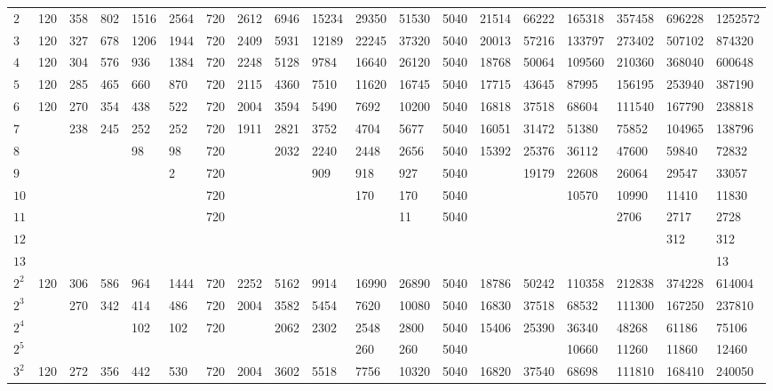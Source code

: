 \documentclass{amsart}
\numberwithin{equation}{section}
\begin{document}
\begin{table}
\begin{tabular}{@{}l GWGWGWGWGWGWGWGWGW@{}}
		$2$ & 120 & 358 & 802 & 1516 & 2564 & 720 & 2612 & 6946 & 15234 & 29350 & 51530 & 5040 & 21514 & 66222 & 165318 & 357458 & 696228 & 1252572 \\
		$3$ & 120 & 327 & 678 & 1206 & 1944 & 720 & 2409 & 5931 & 12189 & 22245 & 37320 & 5040 & 20013 & 57216 & 133797 & 273402 & 507102 & 874320 \\
		$4$ & 120 & 304 & 576 & 936 & 1384 & 720 & 2248 & 5128 & 9784 & 16640 & 26120 & 5040 & 18768 & 50064 & 109560 & 210360 & 368040 & 600648 \\
		$5$ & 120 & 285 & 465 & 660 & 870 & 720 & 2115 & 4360 & 7510 & 11620 & 16745 & 5040 & 17715 & 43645 & 87995 & 156195 & 253940 & 387190 \\
		$6$ & 120 & 270 & 354 & 438 & 522 & 720 & 2004 & 3594 & 5490 & 7692 & 10200 & 5040 & 16818 & 37518 & 68604 & 111540 & 167790 & 238818 \\
		$7$ &  & 238 & 245 & 252 & 252 & 720 & 1911 & 2821 & 3752 & 4704 & 5677 & 5040 & 16051 & 31472 & 51380 & 75852 & 104965 & 138796 \\
		$8$ &  &  &  & 98 & 98 & 720 &  & 2032 & 2240 & 2448 & 2656 & 5040 & 15392 & 25376 & 36112 & 47600 & 59840 & 72832 \\
		$9$ &  &  &  &  & 2 & 720 &  &  & 909 & 918 & 927 & 5040 &  & 19179 & 22608 & 26064 & 29547 & 33057 \\
		$10$ &  &  &  &  &  & 720 &  &  &  & 170 & 170 & 5040 &  &  & 10570 & 10990 & 11410 & 11830 \\
		$11$ &  &  &  &  &  & 720 &  &  &  &  & 11 & 5040 &  &  &  & 2706 & 2717 & 2728 \\
		$12$ &  &  &  &  &  &  &  &  &  &  &  &  &  &  &  &  & 312 & 312 \\
		$13$ &  &  &  &  &  &  &  &  &  &  &  &  &  &  &  &  &  & 13 \\
		$2^2$ & 120 & 306 & 586 & 964 & 1444 & 720 & 2252 & 5162 & 9914 & 16990 & 26890 & 5040 & 18786 & 50242 & 110358 & 212838 & 374228 & 614004 \\
		$2^3$ &  & 270 & 342 & 414 & 486 & 720 & 2004 & 3582 & 5454 & 7620 & 10080 & 5040 & 16830 & 37518 & 68532 & 111300 & 167250 & 237810 \\
		$2^4$ &  &  &  & 102 & 102 & 720 &  & 2062 & 2302 & 2548 & 2800 & 5040 & 15406 & 25390 & 36340 & 48268 & 61186 & 75106 \\
		$2^5$ &  &  &  &  &  &  &  &  &  & 260 & 260 & 5040 &  &  & 10660 & 11260 & 11860 & 12460 \\
		$3^2$ & 120 & 272 & 356 & 442 & 530 & 720 & 2004 & 3602 & 5518 & 7756 & 10320 & 5040 & 16820 & 37540 & 68698 & 111810 & 168410 & 240050 \\

\end{tabular}
\end{table}
\end{document}
